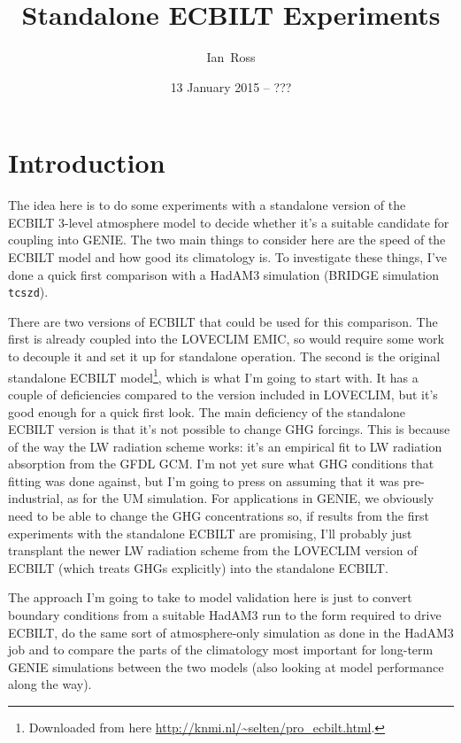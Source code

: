 \documentclass[a4paper,11pt]{article}
\title{Standalone ECBILT Experiments}
\author{Ian~Ross}
\date{13 January 2015 -- ???}
\begin{document}
\maketitle

\section{Introduction}

The idea here is to do some experiments with a standalone version of
the ECBILT 3-level atmosphere model to decide whether it's a suitable
candidate for coupling into GENIE.  The two main things to consider
here are the speed of the ECBILT model and how good its climatology
is.  To investigate these things, I've done a quick first comparison
with a HadAM3 simulation (BRIDGE simulation \texttt{tcszd}).

There are two versions of ECBILT that could be used for this
comparison.  The first is already coupled into the LOVECLIM EMIC, so
would require some work to decouple it and set it up for standalone
operation.  The second is the original standalone ECBILT
model\footnote{Downloaded from here
  \url{http://knmi.nl/~selten/pro_ecbilt.html}.}, which is what I'm
going to start with.  It has a couple of deficiencies compared to the
version included in LOVECLIM, but it's good enough for a quick first
look.  The main deficiency of the standalone ECBILT version is that
it's not possible to change GHG forcings.  This is because of the way
the LW radiation scheme works: it's an empirical fit to LW radiation
absorption from the GFDL GCM.  I'm not yet sure what GHG conditions
that fitting was done against, but I'm going to press on assuming that
it was pre-industrial, as for the UM simulation.  For applications in
GENIE, we obviously need to be able to change the GHG concentrations
so, if results from the first experiments with the standalone ECBILT
are promising, I'll probably just transplant the newer LW radiation
scheme from the LOVECLIM version of ECBILT (which treats GHGs
explicitly) into the standalone ECBILT.

The approach I'm going to take to model validation here is just to
convert boundary conditions from a suitable HadAM3 run to the form
required to drive ECBILT, do the same sort of atmosphere-only
simulation as done in the HadAM3 job and to compare the parts of the
climatology most important for long-term GENIE simulations between the
two models (also looking at model performance along the way).
\end{document}
